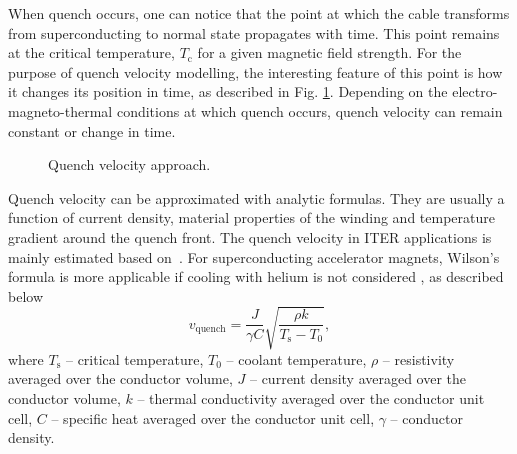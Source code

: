 \documentclass{article}
\begin{document}
When quench occurs, one can notice that the point at which the cable transforms from superconducting to normal state propagates with time. This point remains at the critical temperature, $T_\text{c}$ for a given magnetic field strength. For the purpose of quench velocity modelling, the interesting feature of this point is how it changes its position in time, as described in Fig. \ref{fig:modelling_approach}. Depending on the electro-magneto-thermal conditions at which quench occurs, quench velocity can remain constant or change in time. 

\begin{figure}[H]
\centering
{}
\caption{Quench velocity approach.}
\label{fig:modelling_approach}
\end{figure}

Quench velocity can be approximated with analytic formulas. They are usually a function of current density, material properties of the winding and temperature gradient around the quench front. The quench velocity in ITER applications is mainly estimated based on~\cite{MIT_phd_thesis}. For superconducting accelerator magnets, Wilson's formula is more applicable if cooling with helium is not considered \cite[p.~206]{wilson1987superconducting}, as described below
\begin{equation}
    v_\text{quench}=\frac{J}{\gamma C}\sqrt{\frac{\rho k}{T_\text{s}-T_\text{0}}},
    \label{eqn:Wilson_quench_velocity_formula}
\end{equation}
where $T_\text{s}$ -- critical temperature,
$T_\text{0}$ -- coolant temperature,
$\rho$ -- resistivity averaged over the conductor volume,
$J$ -- current density averaged over the conductor volume,
$k$ -- thermal conductivity averaged over the conductor unit cell,
$C$ -- specific heat averaged over the conductor unit cell,
$\gamma$ -- conductor density.
\end{document}
